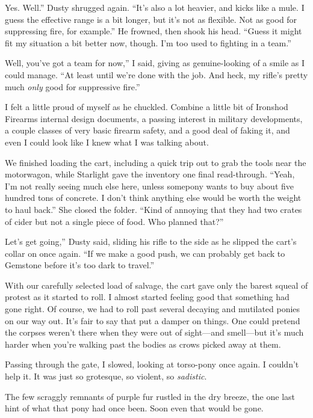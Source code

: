 \leavevmode{}Yes. Well.” Dusty shrugged again. “It’s also a lot heavier, and kicks like a mule. I guess the effective range is a bit longer, but it’s not as flexible. Not as good for suppressing fire, for example.” He frowned, then shook his head. “Guess it might fit my situation a bit better now, though. I’m too used to fighting in a team.”

\leavevmode{}Well, you’ve got a team for now,” I said, giving as genuine-looking of a smile as I could manage. “At least until we’re done with the job. And heck, my rifle’s pretty much \textit{only} good for suppressive fire.”

I felt a little proud of myself as he chuckled. Combine a little bit of Ironshod Firearms internal design documents, a passing interest in military developments, a couple classes of very basic firearm safety, and a good deal of faking it, and even I could look like I knew what I was talking about.

We finished loading the cart, including a quick trip out to grab the tools near the motorwagon, while Starlight gave the inventory one final read-through. “Yeah, I’m not really seeing much else here, unless somepony wants to buy about five hundred tons of concrete. I don’t think anything else would be worth the weight to haul back.” She closed the folder. “Kind of annoying that they had two crates of cider but not a single piece of food. Who planned that?”

\leavevmode{}Let’s get going,” Dusty said, sliding his rifle to the side as he slipped the cart’s collar on once again. “If we make a good push, we can probably get back to Gemstone before it’s too dark to travel.”

With our carefully selected load of salvage, the cart gave only the barest squeal of protest as it started to roll. I almost started feeling good that something had gone right. Of course, we had to roll past several decaying and mutilated ponies on our way out. It’s fair to say that put a damper on things. One could pretend the corpses weren’t there when they were out of sight—and smell—but it’s much harder when you’re walking past the bodies as crows picked away at them.

Passing through the gate, I slowed, looking at torso-pony once again. I couldn’t help it. It was just so grotesque, so violent, so \textit{sadistic}.

The few scraggly remnants of purple fur rustled in the dry breeze, the one last hint of what that pony had once been. Soon even that would be gone.

